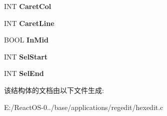 \begin{DoxyCompactItemize}
I\+NT {\bfseries Caret\+Col}
\item 
\mbox{\label{struct_h_e_x_e_d_i_t___d_a_t_a_a9c7c30eb126964e87d6f26a9dcf6beba}} 
I\+NT {\bfseries Caret\+Line}
\item 
\mbox{\label{struct_h_e_x_e_d_i_t___d_a_t_a_a53b3b3712b3a1b9bd47a9b0eff17bc1f}} 
B\+O\+OL {\bfseries In\+Mid}
\item 
\mbox{\label{struct_h_e_x_e_d_i_t___d_a_t_a_a5b07f7a42ef7246280343ff167e19b8d}} 
I\+NT {\bfseries Sel\+Start}
\item 
\mbox{\label{struct_h_e_x_e_d_i_t___d_a_t_a_a7fba1ca7a9fce30e907d86bd7d3ce7fd}} 
I\+NT {\bfseries Sel\+End}
\end{DoxyCompactItemize}


该结构体的文档由以下文件生成\+:\begin{DoxyCompactItemize}
\item 
E\+:/\+React\+O\+S-\/0../base/applications/regedit/hexedit.\+c\end{DoxyCompactItemize}
